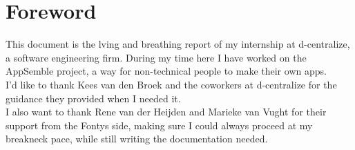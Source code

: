 \chapter{Foreword}
This document is the lving and breathing report of my internship at d-centralize, a software engineering firm. During my time here I have worked on the AppSemble project, a way for non-technical people to make their own apps. \\

I'd like to thank Kees van den Broek and the coworkers at d-centralize for the guidance they provided when I needed it. \\

I also want to thank Rene van der Heijden and Marieke van Vught for their support from the Fontys side, making sure I could always proceed at my breakneck pace, while still writing the documentation needed.